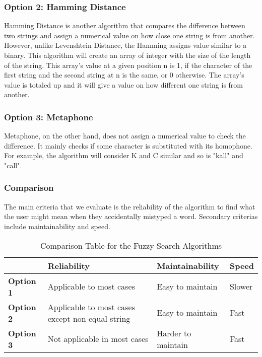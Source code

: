 \documentclass[journal,compsoc, 10pt, draftclsnofoot, onecolumn]{IEEEtran}
\begin{document}
\subsubsection*{Option 2: Hamming Distance}
Hamming Distance is another algorithm that compares the difference between two strings and assign a numerical value on how close one string is from another. However, unlike Levenshtein Distance, the Hamming assigns value similar to a binary. This algorithm will create an array of integer with the size of the length of the string. This array's value at a given position n is 1, if the character of the first string and the second string at n is the same, or 0 otherwise. The array's value is totaled up and it will give a value on how different one string is from another.

\subsubsection*{Option 3: Metaphone}
Metaphone, on the other hand, does not assign a numerical value to check the difference. It mainly checks if some character is substituted with its homophone. For example, the algorithm will consider K and C similar and so is "kall" and "call". 

\subsubsection{Comparison}
The main criteria that we evaluate is the reliability of the algorithm to find what the user might mean when they accidentally mistyped a word. Secondary criterias include maintainability and speed.

\begin{table}[h]
	\centering
	\caption{Comparison Table for the Fuzzy Search Algorithms}
	\label{Comparison Table for the Fuzzy Search Algorithms}
	\begin{tabularx}{\textwidth}{|l|l|l|X|}
		\hline
		\textbf{}         & \textbf{Reliability}                & \textbf{Maintainability}                & \textbf{Speed} 
		\\ \hline
		\textbf{Option 1} & Applicable to most cases & Easy to maintain & Slower
		\\ \hline
		\textbf{Option 2} & Applicable to most cases except non-equal string & Easy to maintain & Fast                                                                                       
		\\ \hline
		\textbf{Option 3} & Not applicable in most cases & Harder to maintain & Fast                                                               
		\\ \hline
	\end{tabularx}
\end{table}
\end{document}

